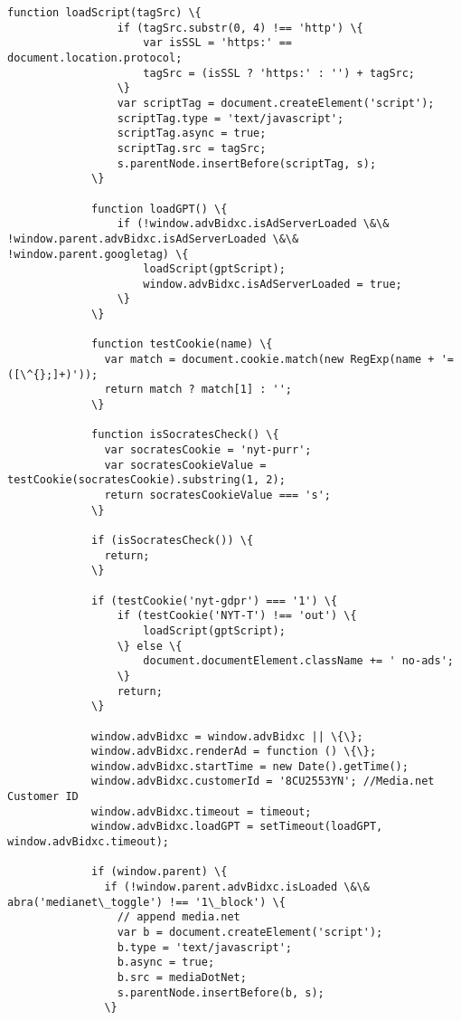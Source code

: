 \documentclass[11pt]{article}
\begin{document}
\begin{Verbatim}[commandchars=\\\{\}]
             function loadScript(tagSrc) \{
                 if (tagSrc.substr(0, 4) !== 'http') \{
                     var isSSL = 'https:' == document.location.protocol;
                     tagSrc = (isSSL ? 'https:' : '') + tagSrc;
                 \}
                 var scriptTag = document.createElement('script');
                 scriptTag.type = 'text/javascript';
                 scriptTag.async = true;
                 scriptTag.src = tagSrc;
                 s.parentNode.insertBefore(scriptTag, s);
             \}
         
             function loadGPT() \{
                 if (!window.advBidxc.isAdServerLoaded \&\& !window.parent.advBidxc.isAdServerLoaded \&\& !window.parent.googletag) \{
                     loadScript(gptScript);
                     window.advBidxc.isAdServerLoaded = true;
                 \}
             \}
         
             function testCookie(name) \{
               var match = document.cookie.match(new RegExp(name + '=([\^{};]+)'));
               return match ? match[1] : '';
             \}
         
             function isSocratesCheck() \{
               var socratesCookie = 'nyt-purr';
               var socratesCookieValue = testCookie(socratesCookie).substring(1, 2);
               return socratesCookieValue === 's';
             \}
         
             if (isSocratesCheck()) \{
               return;
             \}
         
             if (testCookie('nyt-gdpr') === '1') \{
                 if (testCookie('NYT-T') !== 'out') \{
                     loadScript(gptScript);
                 \} else \{
                     document.documentElement.className += ' no-ads';
                 \}
                 return;
             \}
         
             window.advBidxc = window.advBidxc || \{\};
             window.advBidxc.renderAd = function () \{\};
             window.advBidxc.startTime = new Date().getTime();
             window.advBidxc.customerId = '8CU2553YN'; //Media.net Customer ID
             window.advBidxc.timeout = timeout;
             window.advBidxc.loadGPT = setTimeout(loadGPT, window.advBidxc.timeout);
         
             if (window.parent) \{
               if (!window.parent.advBidxc.isLoaded \&\& abra('medianet\_toggle') !== '1\_block') \{
                 // append media.net
                 var b = document.createElement('script');
                 b.type = 'text/javascript';
                 b.async = true;
                 b.src = mediaDotNet;
                 s.parentNode.insertBefore(b, s);
               \}
         

\end{Verbatim}
\end{document}
